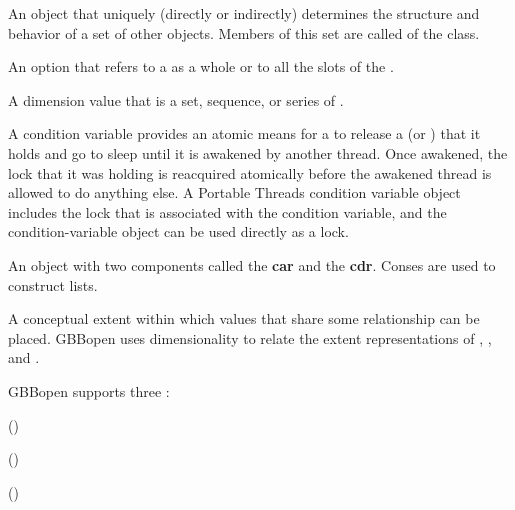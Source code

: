 \documentclass[10pt,twoside,english,pdftex]{article}
\begin{document}
\begin{glossary-list}

\glent[class]
%
%
An object that uniquely (directly or indirectly) determines the structure and
behavior of a set of other objects. Members of this set are called
 of the class.


%
An option that refers to a  as a whole or to all the slots of the
.


% 
A dimension value that is a set, sequence, or series of
.


%
% 
A condition variable provides an atomic means for a  to release
a  (or ) that it holds and go to sleep until
it is awakened by another thread.  Once awakened, the lock that it was holding
is reacquired atomically before the awakened thread is allowed to do anything
else.  A Portable Threads condition variable object includes the lock that is
associated with the condition variable, and the condition-variable object can
be used directly as a lock.


\glent[cons]
%
%
%
%
%
%
An object with two components called the \textbf{car} and the \textbf{cdr}.
Conses are used to construct lists.


\glent[dimension] 
%
A conceptual extent within which values that share some
relationship can be placed.  GBBopen uses dimensionality to relate the
extent representations of ,
, and .

GBBopen supports three :
\begin{tightenumerate}
\item {} ()
\item {} ()
\item {} ()
\end{tightenumerate}


\end{glossary-list}
\end{document}
